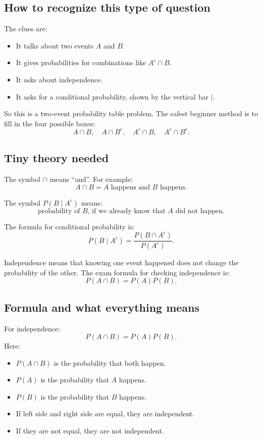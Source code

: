 \documentclass[11pt,a4paper]{article}
\begin{document}
\subsection*{How to recognize this type of question}
The clues are:
\begin{itemize}[leftmargin=*]
    \item It talks about two events \(A\) and \(B\).
    \item It gives probabilities for combinations like \(A^c\cap B\).
    \item It asks about independence.
    \item It asks for a conditional probability, shown by the vertical bar \(\mid\).
\end{itemize}

So this is a two-event probability table problem. The safest beginner method is to fill in the four possible boxes:
\[
A\cap B,\quad A\cap B^c,\quad A^c\cap B,\quad A^c\cap B^c.
\]

\subsection*{Tiny theory needed}
The symbol \(\cap\) means ``and''. For example:
\[
A\cap B=\text{\(A\) happens and \(B\) happens}.
\]

The symbol \(P(B\mid A^c)\) means:
\[
\text{probability of \(B\), if we already know that \(A\) did not happen}.
\]

The formula for conditional probability is:
\[
P(B\mid A^c)=\frac{P(B\cap A^c)}{P(A^c)}.
\]

Independence means that knowing one event happened does not change the probability of the other. The exam formula for checking independence is:
\[
P(A\cap B)=P(A)P(B).
\]

\subsection*{Formula and what everything means}
For independence:
\[
P(A\cap B)=P(A)P(B).
\]
Here:
\begin{itemize}[leftmargin=*]
    \item \(P(A\cap B)\) is the probability that both happen.
    \item \(P(A)\) is the probability that \(A\) happens.
    \item \(P(B)\) is the probability that \(B\) happens.
    \item If left side and right side are equal, they are independent.
    \item If they are not equal, they are not independent.
\end{itemize}
\end{document}
